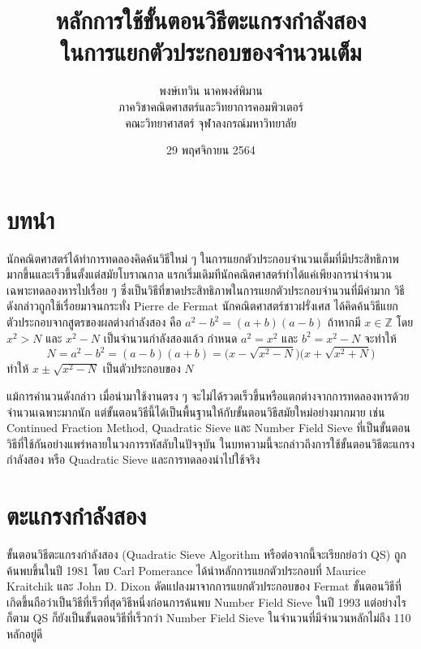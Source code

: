 \documentclass[20pt,a4paper]{article}
\author{พงษ์เทวิน นาคพงศ์พิมาน\\ภาควิชาคณิตศาสตร์และวิทยาการคอมพิวเตอร์ \\ คณะวิทยาศาสตร์ จุฬาลงกรณ์มหาวิทยาลัย}
\title{หลักการใช้ขั้นตอนวิธีตะแกรงกำลังสอง \\ ในการแยกตัวประกอบของจำนวนเต็ม}
\date{29 พฤศจิกายน 2564}
\begin{document}
\maketitle
\section{บทนำ}
นักคณิตศาสตร์ได้ทำการทดลองคิดค้นวิธีใหม่ ๆ ในการแยกตัวประกอบจำนวนเต็มที่มีประสิทธิภาพมากขึ้นและเร็วขึ้นตั้งแต่สมัยโบราณกาล แรกเริ่มเดิมทีนักคณิตศาสตร์ทำได้แค่เพียงการนำจำนวนเฉพาะทดลองหารไปเรื่อย ๆ ซึ่งเป็นวิธีที่ขาดประสิทธิภาพในการแยกตัวประกอบจำนวนที่มีค่ามาก วิธีดังกล่าวถูกใช้เรื่อยมาจนกระทั่ง Pierre de Fermat นักคณิตศาสตร์ชาวฝรั่งเศส ได้คิดค้นวิธีแยกตัวประกอบจากสูตรของผลต่างกำลังสอง คือ $a^2-b^2 =(a+b)(a-b)$ ถ้าหากมี
$x\in \mathbb{Z}$ โดย $x^2 > N$ และ $x^2-N$ เป็นจำนวนกำลังสองแล้ว กำหนด $a^2 = x^2$ และ $b^2 = x^2 - N$ จะทำให้
\begin{equation}
    N = a^2 - b^2 = (a-b)(a+b) = \big(x-\sqrt{x^2-N}\big)\big(x+\sqrt{x^2+N}\big)
\end{equation}
ทำให้ $x\pm\sqrt{x^2-N}$ เป็นตัวประกอบของ $N$
\vspace{4mm}

แม้การคำนวนดังกล่าว เมื่อนำมาใช้งานตรง ๆ จะไม่ได้รวดเร็วขึ้นหรือแตกต่างจากการทดลองหารด้วยจำนวนเฉพาะมากนัก แต่ขั้นตอนวิธีนี้ได้เป็นพื้นฐานให้กับขั้นตอนวิธีสมัยใหม่อย่างมากมาย เช่น Continued Fraction Method, Quadratic Sieve และ Number Field Sieve ที่เป็นขั้นตอนวิธีที่ใช้กันอย่างแพร่หลายในวงการรหัสลับในปัจจุบัน ในบทความนี้จะกล่าวถึงการใช้ขั้นตอนวิธีตะแกรงกำลังสอง หรือ Quadratic Sieve และการทดลองนำไปใช้จริง
\section{ตะแกรงกำลังสอง}
ขั้นตอนวิธีตะแกรงกำลังสอง (Quadratic Sieve Algorithm หรือต่อจากนี้จะเรียกย่อว่า QS) ถูกค้นพบขึ้นในปี 1981 โดย Carl Pomerance \cite{pomerance} 
ได้นำหลักการแยกตัวประกอบที่ Maurice Kraitchik และ John D. Dixon ดัดแปลงมาจากการแยกตัวประกอบของ Fermat ขั้นตอนวิธีที่เกิดขึ้นถือว่าเป็นวิธีที่เร็วที่สุดวิธีหนึ่งก่อนการค้นพบ Number Field Sieve ในปี 1993 แต่อย่างไรก็ตาม QS ก็ยังเป็นขั้นตอนวิธีที่เร็วกว่า Number Field Sieve ในจำนวนที่มีจำนวนหลักไม่ถึง 110 หลักอยู่ดี
\end{document}

